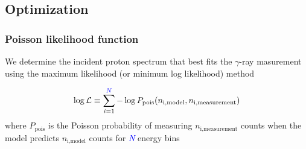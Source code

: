 \documentclass{beamer}
\begin{document}
\subsection{Optimization}
\begin{frame}
\frametitle{Poisson likelihood function}
We determine the incident proton spectrum that best fits the $\gamma$-ray masurement using the maximum likelihood (or minimum log likelihood) method

\begin{equation*}
  \log\mathcal{L} \equiv \sum_{i=1}^{\textcolor{blue}{N}} -\log P_{\text{pois}}(n_{\text{i,model}}, n_{\text{i,measurement}})
\end{equation*}
where $P_{\text{pois}}$ is the Poisson probability of measuring $n_{\text{i,measurement}}$ counts when the model predicts $n_{\text{i,model}}$ counts for \textit{\textcolor{blue}{N}} energy bins

\end{frame}
\end{document}
